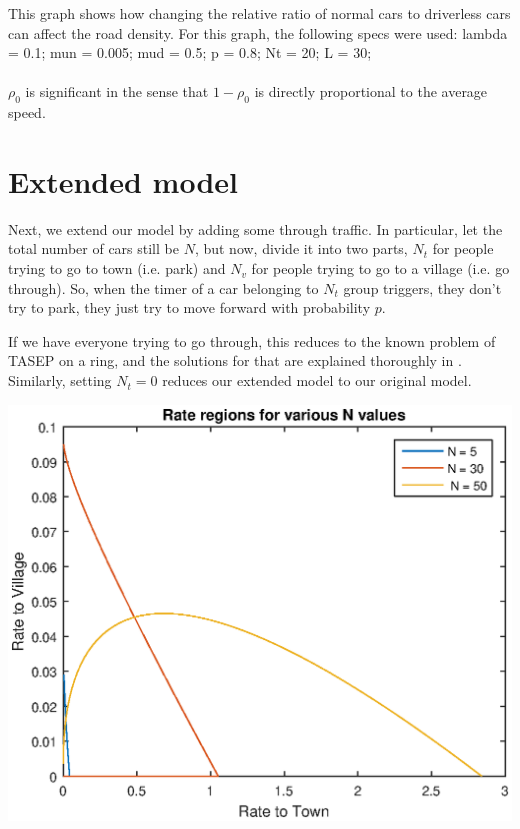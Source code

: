 \documentclass[]{article}
\begin{document}
 This graph shows how changing the relative ratio of normal cars to driverless cars can affect the road density. For this graph, the following specs were used:
lambda = 0.1;
mun = 0.005;
mud = 0.5;
p = 0.8;
Nt = 20;
L = 30;
\\\\

$\rho_0$ is significant in the sense that $1 - \rho_0$ is directly proportional to the average speed. 


\section*{Extended model}

Next, we extend our model by adding some through traffic. In particular, let the total number of cars still be $N$, but now, divide it into two parts, $N_t$ for people trying to go to town (i.e. park) and $N_v$ for people trying to go to a village (i.e. go through). So, when the timer of a car belonging to $N_t$ group triggers, they don't try to park, they just try to move forward with probability $p$.

If we have everyone trying to go through, this reduces to the known problem of TASEP on a ring, and the solutions for that are explained thoroughly in \cite{statPhys}. Similarly, setting $N_t = 0$ reduces our extended model to our original model.

\includegraphics{graph3.eps}
\end{document}
